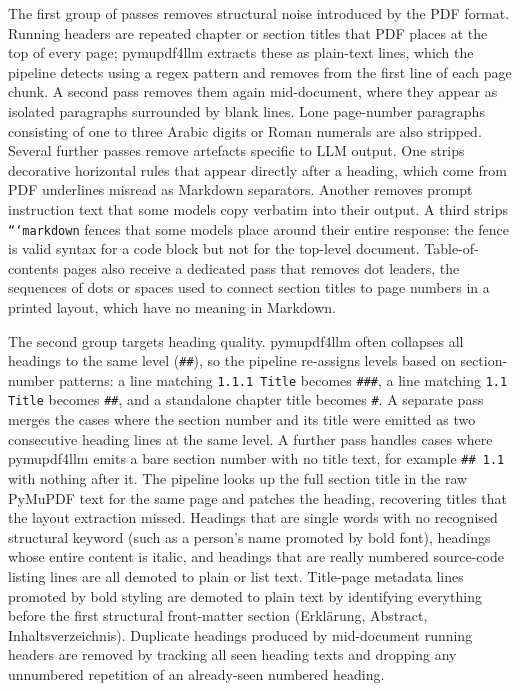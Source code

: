 The first group of passes removes structural noise introduced by the PDF format.
Running headers are repeated chapter or section titles that PDF places at the top of every page; pymupdf4llm extracts these as plain-text lines, which the pipeline detects using a regex pattern and removes from the first line of each page chunk.
A second pass removes them again mid-document, where they appear as isolated paragraphs surrounded by blank lines.
Lone page-number paragraphs consisting of one to three Arabic digits or Roman numerals are also stripped.
Several further passes remove artefacts specific to LLM output.
One strips decorative horizontal rules that appear directly after a heading, which come from PDF underlines misread as Markdown separators.
Another removes prompt instruction text that some models copy verbatim into their output.
A third strips \texttt{```markdown} fences that some models place around their entire response: the fence is valid syntax for a code block but not for the top-level document.
Table-of-contents pages also receive a dedicated pass that removes dot leaders, the sequences of dots or spaces used to connect section titles to page numbers in a printed layout, which have no meaning in Markdown.

The second group targets heading quality.
pymupdf4llm often collapses all headings to the same level (\texttt{\#\#}), so the pipeline re-assigns levels based on section-number patterns: a line matching \texttt{1.1.1 Title} becomes \texttt{\#\#\#}, a line matching \texttt{1.1 Title} becomes \texttt{\#\#}, and a standalone chapter title becomes \texttt{\#}.
A separate pass merges the cases where the section number and its title were emitted as two consecutive heading lines at the same level.
A further pass handles cases where pymupdf4llm emits a bare section number with no title text, for example \texttt{\#\# 1.1} with nothing after it. The pipeline looks up the full section title in the raw PyMuPDF text for the same page and patches the heading, recovering titles that the layout extraction missed.
Headings that are single words with no recognised structural keyword (such as a person's name promoted by bold font), headings whose entire content is italic, and headings that are really numbered source-code listing lines are all demoted to plain or list text.
Title-page metadata lines promoted by bold styling are demoted to plain text by identifying everything before the first structural front-matter section (Erkl\"{a}rung, Abstract, Inhaltsverzeichnis).
Duplicate headings produced by mid-document running headers are removed by tracking all seen heading texts and dropping any unnumbered repetition of an already-seen numbered heading.

